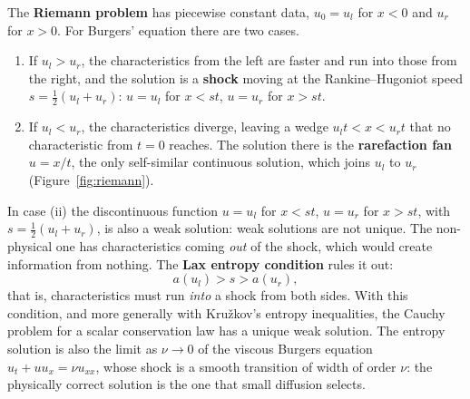 \documentclass[11pt,a4paper]{article}
\numberwithin{equation}{section}
\theoremstyle{definition}
\begin{document}
The \textbf{Riemann problem} has piecewise constant data, $u_0 = u_l$ for $x < 0$ and $u_r$ for $x > 0$. For Burgers' equation there are two cases.
\begin{enumerate}[label=(\roman*)]
\item If $u_l > u_r$, the characteristics from the left are faster and run into those from the right, and the solution is a \textbf{shock} moving at the Rankine--Hugoniot speed $s = \frac12(u_l + u_r)$:
$u = u_l$ for $x < st$, $u = u_r$ for $x > st$.
\item If $u_l < u_r$, the characteristics diverge, leaving a wedge $u_lt < x < u_rt$ that no characteristic from $t = 0$ reaches. The solution there is the \textbf{rarefaction fan} $u = x/t$, the only self-similar continuous
solution, which joins $u_l$ to $u_r$ (Figure~\ref{fig:riemann}).
\end{enumerate}
In case (ii) the discontinuous function $u = u_l$ for $x < st$, $u = u_r$ for $x > st$, with $s = \frac12(u_l + u_r)$, is also a weak solution: weak solutions are not unique. The non-physical one has characteristics
coming \emph{out} of the shock, which would create information from nothing. The \textbf{Lax entropy condition} rules it out:
\[
a(u_l) > s > a(u_r),
\]
that is, characteristics must run \emph{into} a shock from both sides. With this condition, and more generally with Kru\v{z}kov's entropy inequalities, the Cauchy problem for a scalar conservation law
has a unique weak solution. The entropy solution is also the limit as $\nu \to 0$ of the viscous Burgers equation $u_t + uu_x = \nu u_{xx}$, whose shock is a smooth transition of width of order $\nu$: the physically correct solution is the one that small
diffusion selects.
\end{document}
